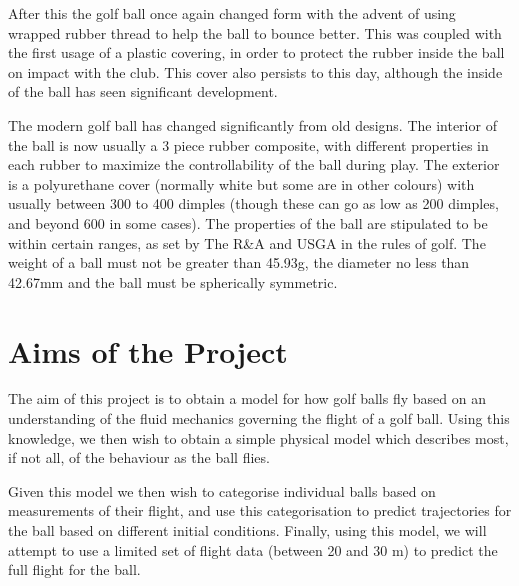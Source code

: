 After this the golf ball once again changed form with the advent of using wrapped rubber
thread to help the ball to bounce better. This was coupled with the first usage of a plastic 
covering, in order to protect the rubber inside the ball on impact with the
club. This cover also persists to this day, although the inside of the ball has seen significant
development.

The modern golf ball has changed significantly from old designs. The interior of the ball is
now usually a 3 piece rubber composite, with different properties in each rubber to maximize
the controllability of the ball during play. The exterior is a polyurethane cover (normally white
but some are in other colours) with usually between 300 to 400 dimples (though these can go as 
low as 200 dimples, and beyond 600 in some cases). The properties of the ball are stipulated to be
within certain ranges, as set by The R\&A and USGA in the rules of golf. The weight of a ball must
not be greater than 45.93g, the diameter no less than 42.67mm and the ball must be spherically symmetric.

\section{Aims of the Project}

The aim of this project is to obtain a model for how golf balls fly based on an understanding of the
fluid mechanics governing the flight of a golf ball. Using this knowledge, we then wish to obtain a
simple physical model which describes most, if not all, of the behaviour as the ball flies.

Given this model we then wish to categorise individual balls based on measurements of their flight, and
use this categorisation to predict trajectories for the ball based on different initial conditions.
Finally, using this model, we will attempt to use a limited set of flight data (between 20 and 30 m)
to predict the full flight for the ball.